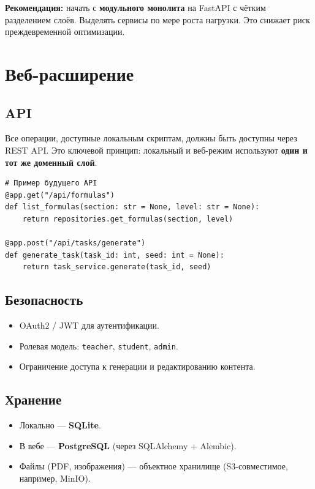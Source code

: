 \documentclass[12pt,a4paper]{article}
\newcommand{\code}[1]{\texttt{#1}}
\begin{document}
\noindent
\textbf{Рекомендация:} начать с \textbf{модульного монолита} на
FastAPI с чётким разделением слоёв. Выделять сервисы по мере
роста нагрузки. Это снижает риск преждевременной оптимизации.

\section{Веб-расширение}

\subsection{API}

Все операции, доступные локальным скриптам, должны быть
доступны через REST API. Это ключевой принцип: локальный
и веб-режим используют \textbf{один и тот же доменный слой}.

\begin{verbatim}
# Пример будущего API
@app.get("/api/formulas")
def list_formulas(section: str = None, level: str = None):
    return repositories.get_formulas(section, level)

@app.post("/api/tasks/generate")
def generate_task(task_id: int, seed: int = None):
    return task_service.generate(task_id, seed)
\end{verbatim}

\subsection{Безопасность}

\begin{itemize}
    \item OAuth2 / JWT для аутентификации.
    \item Ролевая модель: \code{teacher}, \code{student}, \code{admin}.
    \item Ограничение доступа к генерации и редактированию
          контента.
\end{itemize}

\subsection{Хранение}

\begin{itemize}
    \item Локально --- \textbf{SQLite}.
    \item В вебе --- \textbf{PostgreSQL} (через SQLAlchemy + Alembic).
    \item Файлы (PDF, изображения) --- объектное хранилище (S3-совместимое,
          например, MinIO).
\end{itemize}
\end{document}
